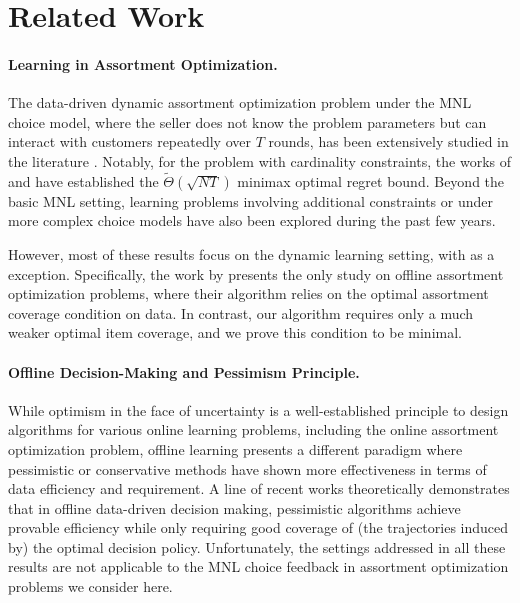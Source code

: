 \section{Related Work}
\paragraph{Learning in Assortment Optimization.} The data-driven dynamic assortment optimization problem under the MNL choice model, where the seller does not know the problem parameters but can interact with customers repeatedly over $T$ rounds, has been extensively studied in the literature \citep{caro2007dynamic,rusmevichientong2010dynamic,saure2013optimal,agrawal2017thompson,agrawal2019mnl,chen2021optimal,saha2024stop}. 
Notably, for the problem with cardinality constraints, the works of \citet{agrawal2017thompson,agrawal2019mnl} and \citet{chen2018note} have established the $\widetilde{\Theta}(\sqrt{NT})$ minimax optimal regret bound. 
Beyond the basic MNL setting, learning problems involving additional constraints \citep{cheung2017assortment,aznag2021mnl,chen2024re} or under more complex choice models \citep{ou2018multinomial,oh2021multinomial,perivier2022dynamic,lee2024nearly,chen2021dynamic,li2022onlineassortment,zhang2024online} have also been explored during the past few years.

However, most of these results focus on the dynamic learning setting, with \citet{dong2023pasta} as a exception. Specifically, the work by \citet{dong2023pasta} presents the only study on offline assortment optimization problems, where their algorithm relies on the optimal assortment coverage condition on data. 
In contrast, our algorithm requires only a much weaker optimal item coverage, and we prove this condition to be minimal.


\paragraph{Offline Decision-Making and Pessimism Principle.} 
While optimism in the face of uncertainty is a well-established principle to design algorithms for various online learning problems, including the online assortment optimization problem, offline learning presents a different paradigm where pessimistic or conservative methods \citep{yu2020mopo,kumar2020conservative} have shown more effectiveness in terms of data efficiency and requirement. 
A line of recent works \citep{jin2021pessimism,rashidinejad2021bridging,xie2021bellman,uehara2021pessimistic,zhong2022pessimistic,zhan2022offline,liu2022welfare,shi2022pessimistic,lu2023pessimism,xiong2023nearly,rashidinejad2023optimal, blanchet2024double} theoretically demonstrates that in offline data-driven decision making, pessimistic algorithms achieve provable efficiency while only requiring good coverage of (the trajectories induced by) the optimal decision policy. 
Unfortunately, the settings addressed in all these results are not applicable to the MNL choice feedback in assortment optimization problems we consider here.